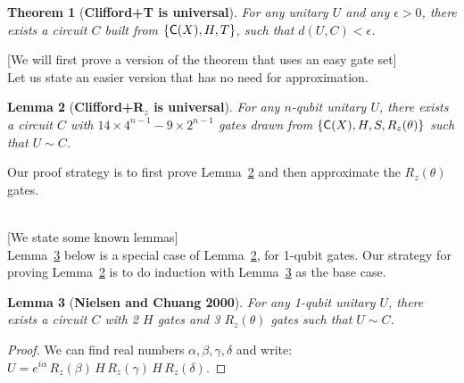 \documentclass[11pt]{article}
\newtheorem{theorem}{Theorem}
\newtheorem{lemma}[theorem]{Lemma}
\def\C#1{\text{\sf C}{(#1)}}
\begin{document}
\begin{theorem}[\bf Clifford+T is universal]
\label{thm:clifford-plus-t-is-universal}
For any unitary $U$ and any $\epsilon > 0$, 
there exists a circuit $C$ built from $\{\C{X}, H, T\}$,
such that $d(U,C) < \epsilon$.
\end{theorem}

\hspace*{1cm}
   [We will first prove a version of the theorem that uses an easy gate set] \\
Let us state an easier version that has no need for approximation.

\begin{lemma}[\bf Clifford+R$_z$ is universal]
For any $n$-qubit unitary $U$,
there exists a circuit $C$ with 
$14 \times 4^{n-1} - 9 \times 2^{n-1}$ gates drawn from
$\{\C{X}, H, S, R_z(\theta)\}$ such that $U \sim C$.
\label{lem:clifford-plus-rx-is-universal}
\end{lemma}

Our proof strategy is to first prove 
Lemma~\ref{lem:clifford-plus-rx-is-universal}
and then approximate the $R_z(\theta)$ gates.

\newpage

\mbox{} \\ \hspace*{1cm}
   [We state some known lemmas] \\
Lemma~\ref{lem:clifford-plus-rx-is-universal-for-1-qubit-gates} below
is a special case of Lemma~\ref{lem:clifford-plus-rx-is-universal},
for 1-qubit gates.
Our strategy for proving 
Lemma~\ref{lem:clifford-plus-rx-is-universal}
is to do induction with
Lemma~\ref{lem:clifford-plus-rx-is-universal-for-1-qubit-gates} 
as the base case.

\begin{lemma}[\bf Nielsen and Chuang 2000]
For any 1-qubit unitary $U$,
there exists a circuit $C$ with
2 $H$ gates and 3 $R_z(\theta)$ gates
such that $U \sim C$.
\label{lem:clifford-plus-rx-is-universal-for-1-qubit-gates}
\end{lemma}

\begin{proof}
We can find 
real numbers $\alpha,\beta,\gamma,\delta$ and write:
$U =
e^{i\alpha}\,
R_z(\beta)\,
H\,
R_z(\gamma)\,
H\,
R_z(\delta)$.
\end{proof}
\end{document}
